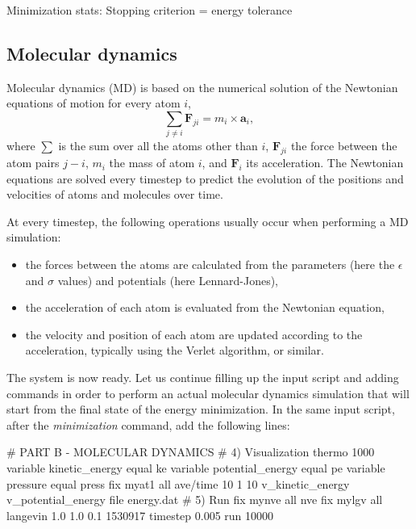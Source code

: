 \begin{lcverbatim}
Minimization stats:
Stopping criterion = energy tolerance
\end{lcverbatim}

\noindent \subsection{Molecular dynamics}

\begin{tcolorbox}[colback=mylightblue!5!white,colframe=mylightblue!75!black,title=Background Information -- What is molecular dynamics?]
Molecular dynamics (MD) is based on the numerical solution of the Newtonian
equations of motion for every atom $i$,
$$\sum_{j \ne i} \boldsymbol{F}_{ji} = m_i \times \boldsymbol{a}_i,$$
where $\sum$ is the sum over all the atoms other than $i$, 
$\boldsymbol{F}_{ji}$ the force between the atom pairs $j-i$,
$m_i$ the mass of atom $i$, and $\boldsymbol{F}_i$ its acceleration. 
The Newtonian equations are solved every timestep to predict the
evolution of the positions and velocities of atoms and molecules over time. 

At every timestep, the following operations usually occur when 
performing a MD simulation:
\begin{itemize}
\item the forces between the atoms are calculated from the parameters (here the $\epsilon$ and $\sigma$ values) and potentials (here Lennard-Jones),
\item the acceleration of each atom is evaluated from the Newtonian equation,
\item the velocity and position of each atom are updated according to the acceleration, typically using the Verlet algorithm, or similar.
\end{itemize}
\end{tcolorbox}

\noindent The system is now ready. Let us continue filling up the
input script and adding commands in order to perform an actual molecular dynamics
simulation that will start from the final state of the energy minimization.
In the same input script, after the \textit{minimization} command, add the following
lines:

\begin{lcverbatim}
# PART B - MOLECULAR DYNAMICS
# 4) Visualization
thermo 1000
variable kinetic_energy equal ke
variable potential_energy equal pe
variable pressure equal press
fix myat1 all ave/time 10 1 10 v_kinetic_energy v_potential_energy file energy.dat
# 5) Run
fix mynve all nve
fix mylgv all langevin 1.0 1.0 0.1 1530917
timestep 0.005
run 10000
\end{lcverbatim}

